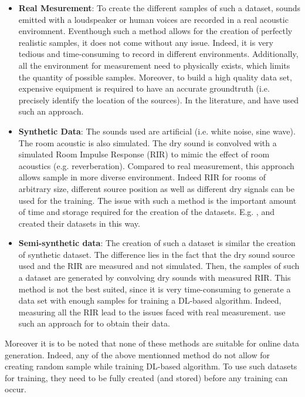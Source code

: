 \documentclass{article}
\begin{document}
\begin{itemize}
    \item \textbf{Real Mesurement}: To create the different samples of such a dataset, sounds emitted with a loudspeaker or human voices are recorded in a real acoustic enviromnent. Eventhough such a method allows for the creation of perfectly realistic samples, it does not come without any issue. Indeed, it is very tedious and time-consuming to record in different environments. Additionally, all the environment for measurement need to physically exists, which limits the quantity of possible samples. Moreover, to build a high quality data set, expensive equipment is required to have an accurate groundtruth (i.e. precisely identify the location of the sources). In the literature, \cite{he2018deep} and \cite{ferguson2018sound} have used such an approach.
    \item \textbf{Synthetic Data}: The sounds used are artificial (i.e. white noise, sine wave). The room acoustic is also simulated. The dry sound is convolved with a simulated Room Impulse Response (RIR) to mimic the effect of room acoustics (e.g. reverberation). Compared to real measurement, this approach allows sample in more diverse environment. Indeed RIR for rooms of arbitrary size, different source position as well as different dry signals can be used for the training. The issue with such a method is the important amount of time and storage required for the creation of the datasets. E.g. \cite{chakrabarty2017broadband}, \cite{perotin2018crnn} and \cite{adavanne2018direction} created their datasets in this way.
    \item \textbf{Semi-synthetic data}: The creation of such a dataset is similar the creation of synthetic dataset. The difference lies in the fact that the dry sound source used and the RIR are measured and not simulated. Then, the samples of such a dataset are generated by convolving dry sounds with measured RIR. This method is not the best suited, since it is very time-consuming to generate a data set with enough samples for training a DL-based algorithm. Indeed, measuring all the RIR lead to the issues faced with real measurement. \cite{takeda2016sound} use such an approach for to obtain their data.
\end{itemize}

Moreover it is to be noted that none of these methods are suitable for online data generation. Indeed, any of the above mentionned method do not allow for creating random sample while training DL-based algorithm. To use such datasets for training, they need to be fully created (and stored) before any training can occur.
\end{document}
